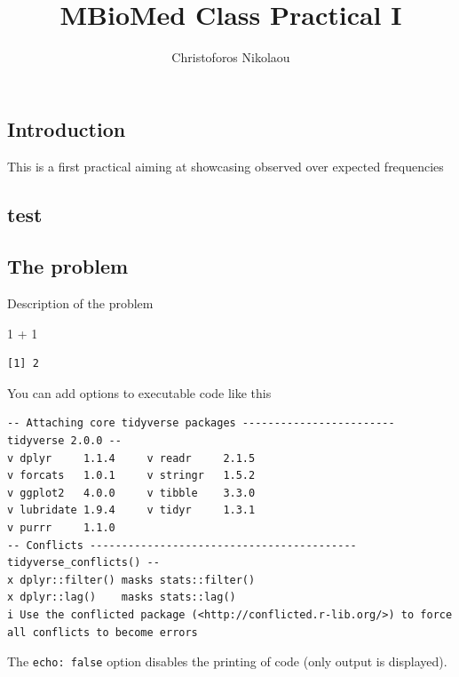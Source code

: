 \documentclass[
  letterpaper,
  DIV=11,
  numbers=noendperiod]{scrartcl}
\title{MBioMed Class Practical I}
\author{Christoforos Nikolaou}
\date{}
\newenvironment{Shaded}{\begin{snugshade}}{\end{snugshade}}
\newcommand{\AttributeTok}[1]{\textcolor[rgb]{0.40,0.45,0.13}{#1}}
\newcommand{\DecValTok}[1]{\textcolor[rgb]{0.68,0.00,0.00}{#1}}
\newcommand{\FunctionTok}[1]{\textcolor[rgb]{0.28,0.35,0.67}{#1}}
\newcommand{\NormalTok}[1]{\textcolor[rgb]{0.00,0.23,0.31}{#1}}
\newcommand{\OtherTok}[1]{\textcolor[rgb]{0.00,0.23,0.31}{#1}}
\newcommand{\SpecialCharTok}[1]{\textcolor[rgb]{0.37,0.37,0.37}{#1}}
\newcommand{\StringTok}[1]{\textcolor[rgb]{0.13,0.47,0.30}{#1}}
\begin{document}
\maketitle


\subsection{Introduction}\label{introduction}

This is a first practical aiming at showcasing observed over expected
frequencies

\subsection{test}\label{test}

\subsection{The problem}\label{the-problem}

Description of the problem

\begin{Shaded}
\begin{Highlighting}[]
\DecValTok{1} \SpecialCharTok{+} \DecValTok{1}
\end{Highlighting}
\end{Shaded}

\begin{verbatim}
[1] 2
\end{verbatim}

You can add options to executable code like this

\begin{verbatim}
-- Attaching core tidyverse packages ------------------------ tidyverse 2.0.0 --
v dplyr     1.1.4     v readr     2.1.5
v forcats   1.0.1     v stringr   1.5.2
v ggplot2   4.0.0     v tibble    3.3.0
v lubridate 1.9.4     v tidyr     1.3.1
v purrr     1.1.0     
-- Conflicts ------------------------------------------ tidyverse_conflicts() --
x dplyr::filter() masks stats::filter()
x dplyr::lag()    masks stats::lag()
i Use the conflicted package (<http://conflicted.r-lib.org/>) to force all conflicts to become errors
\end{verbatim}

The \texttt{echo:\ false} option disables the printing of code (only
output is displayed).

\begin{Shaded}
\end{Shaded}
\end{document}
